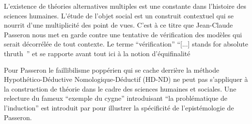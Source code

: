
L’existence de théories alternatives multiples est une constante dans l’histoire des sciences humaines. L'étude de l'objet social est un construit contextuel qui se nourrit d'une multiplicité des point de vues. C'est à ce titre que Jean-Claude Passeron \autocite{Passeron2006} nous met en garde contre une tentative de vérification des modèles qui serait décorrélée de tout contexte. Le terme \enquote{vérification} \foreignquote{english}{[...] stands for absolute thruth } \autocites{David2009, Oreskes1994} et se rapporte avant tout ici à la notion d'équifinalité \autocite{OSullivan2004} 

Pour Passeron le faillibilisme poppérien qui se cache derrière la méthode Hypothético-Déductive Nomologique-Déductif (HD-ND) ne peut pas s'appliquer à la construction de théorie dans le cadre des sciences humaines et sociales. Une relecture du fameux \enquote{exemple du cygne} introduisant \enquote{la problématique de l'induction} est introduit par \cite{Allard2000} pour illustrer la spécificité de l'epistémologie de Passeron.

